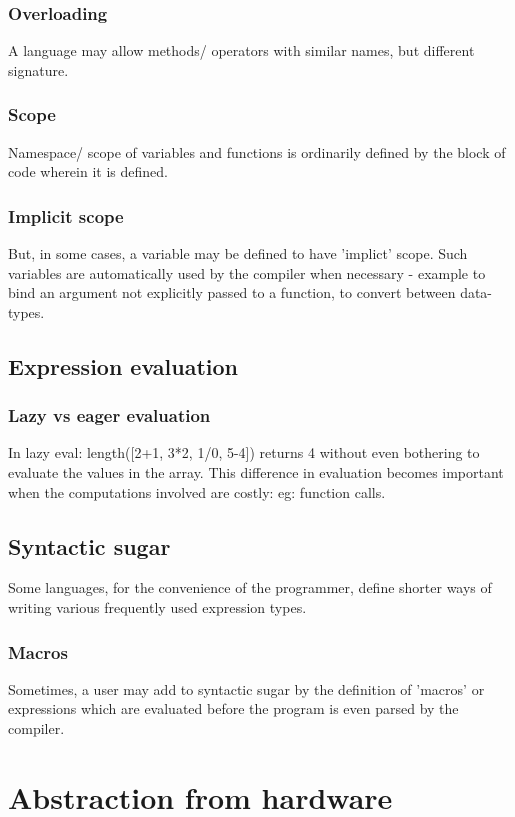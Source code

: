 \documentclass[oneside, article]{memoir}
\begin{document}
\subsubsection{Overloading}
A language may allow methods/ operators with similar names, but different signature. 

\subsubsection{Scope}
Namespace/ scope of variables and functions is ordinarily defined by the block of code wherein it is defined.

\subsubsection{Implicit scope}
But, in some cases, a variable may be defined to have 'implict' scope. Such variables are automatically used by the compiler when necessary - example to bind an argument not explicitly passed to a function, to convert between data-types.

\subsection{Expression evaluation}
\subsubsection{Lazy vs eager evaluation}
In lazy eval: length([2+1, 3*2, 1/0, 5-4]) returns 4 without even bothering to evaluate the values in the array. This difference in evaluation becomes important when the computations involved are costly: eg: function calls.

\subsection{Syntactic sugar}
Some languages, for the convenience of the programmer, define shorter ways of writing various frequently used expression types.

\subsubsection{Macros}
Sometimes, a user may add to syntactic sugar by the definition of 'macros' or expressions which are evaluated before the program is even parsed by the compiler.

\section{Abstraction from hardware}
\end{document}
